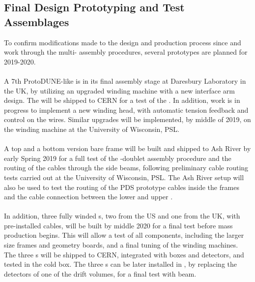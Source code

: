 


\subsection{Final Design Prototyping and Test Assemblages}
\label{sec:fdsp-apa-qa-prototyping}

To confirm modifications made to the  design and production process since  and work through the multi- assembly procedures, several prototypes are planned for 2019-2020.\\
\\
A 7th ProtoDUNE-like  is in its final assembly stage at Daresbury Laboratory in the UK, by utilizing an upgraded winding machine with a new interface arm design. The  will be shipped to CERN for a test of the . In addition, work is in progress to implement a new winding head, with automatic tension feedback and control on the wires. Similar upgrades will be implemented, by middle of 2019, on the winding machine at the University of Wisconsin, PSL.\\
\\
A top and a bottom version bare  frame will be built and shipped to Ash River by early Spring 2019 for a full test of the -doublet assembly procedure and the routing of the  cables through the  side beams, following preliminary cable routing tests carried out at the University of Wisconsin, PSL. The Ash River setup will also be used to test the routing of the PDS prototype cables inside the  frames and the cable connection between the lower and upper .\\
\\
In addition, three fully winded s, two from the US and one from the UK, with pre-installed  cables, will be built by middle 2020 for a final test before mass production begins. This will allow a test of all  components, including the larger size frames and geometry boards, and a final tuning of the winding machines. The three s will be shipped to CERN, integrated with  boxes and  detectors, and tested in the cold box. The three s can be later installed in , by replacing the detectors of one of the drift volumes, for a final test with beam.  

